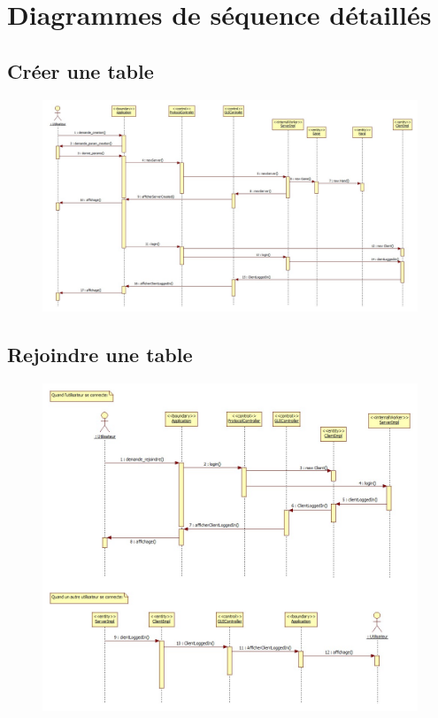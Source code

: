 \chapter{Diagrammes de séquence détaillés}
\clearpage
\section{Créer une table}
\begin{figure}[ht]
	\centering \includegraphics[angle=90, width=.6\linewidth]{figures/DetailedTableCreationSequenceDiagram.jpg}
\end{figure}
\clearpage
\section{Rejoindre une table}
\begin{figure}[ht]
	\centering \includegraphics[angle=90, width=\linewidth]{figures/DetailedTableJoinSequenceSequenceDiagram.jpg}
\end{figure}
\clearpage
